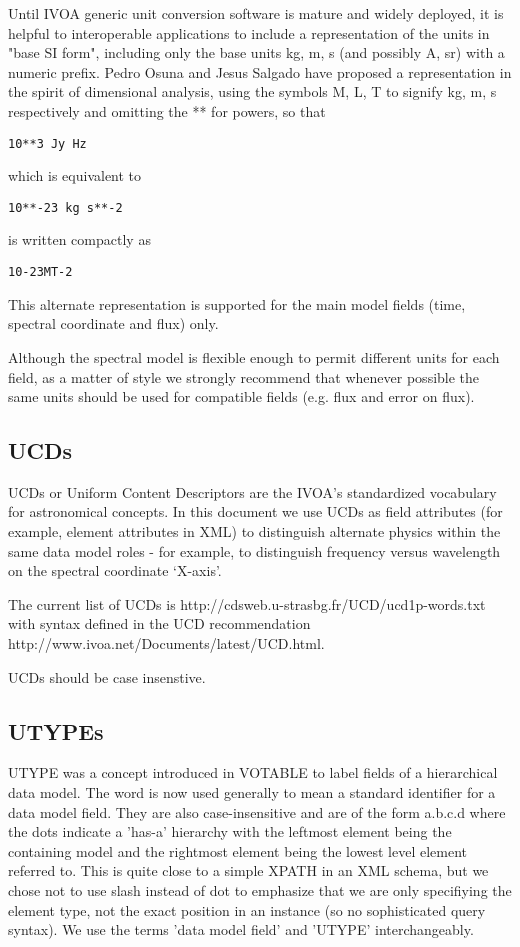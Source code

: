 \documentclass[11pt]{article}
\begin{document}
Until IVOA generic unit conversion software is mature and widely deployed, 
it is helpful to interoperable applications to include a representation
of the units in "base SI form", including only the base units kg, m, s (and
possibly A, sr) with a numeric prefix. Pedro Osuna and Jesus Salgado have proposed
a representation in the spirit of dimensional analysis, using the symbols
M, L, T to signify kg, m, s respectively and omitting the ** for powers, so
that 
\begin{verbatim}
10**3 Jy Hz
\end{verbatim}
which is equivalent to
\begin{verbatim}
10**-23 kg s**-2
\end{verbatim}
is written compactly as
\begin{verbatim}
10-23MT-2
\end{verbatim}

This alternate representation is supported for the
main model fields (time, spectral coordinate and flux) only.



Although the spectral model is flexible enough to permit different units
for each field, as a matter of style we strongly recommend that whenever
possible the
same units should be used for compatible fields (e.g. flux and error on flux).

\subsection{UCDs}

UCDs or Uniform Content Descriptors are the IVOA's standardized vocabulary
for astronomical concepts. In this document we use UCDs as field attributes
(for example, element attributes in XML) to distinguish alternate 
physics within the same data model roles - for example, to distinguish
frequency versus wavelength on the spectral coordinate `X-axis'.

The current list of UCDs is
http://cdsweb.u-strasbg.fr/UCD/ucd1p-words.txt
with syntax defined in the UCD recommendation
http://www.ivoa.net/Documents/latest/UCD.html.

UCDs should be case insenstive.

\subsection{UTYPEs}

UTYPE was a concept introduced in VOTABLE to label fields of a hierarchical
data model. The word is now used generally to mean a standard identifier
for a data model field. They are also case-insensitive and are of the
form a.b.c.d  where the dots indicate a 'has-a' hierarchy
with the leftmost element being the containing model and the rightmost
element being the lowest level element referred to. This is quite close
to a simple XPATH in an XML schema, but we chose not to use slash instead of
dot to emphasize that we are only specifiying the element type, not the
exact position in an instance (so no sophisticated query syntax).
We use the terms 'data model field' and 'UTYPE' interchangeably.
\end{document}
